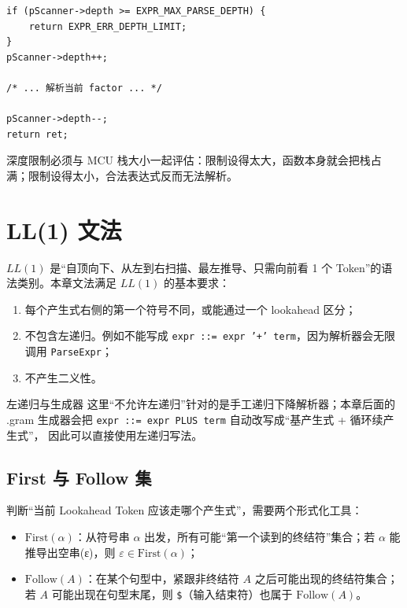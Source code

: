 \begin{lstlisting}[style=c]
if (pScanner->depth >= EXPR_MAX_PARSE_DEPTH) {
    return EXPR_ERR_DEPTH_LIMIT;
}
pScanner->depth++;

/* ... 解析当前 factor ... */

pScanner->depth--;
return ret;
\end{lstlisting}

深度限制必须与 MCU 栈大小一起评估：限制设得太大，函数本身就会把栈占满；限制设得太小，合法表达式反而无法解析。

\section{LL(1) 文法}

$LL(1)$ 是“自顶向下、从左到右扫描、最左推导、只需向前看 1 个 Token”的语法类别。本章文法满足 $LL(1)$ 的基本要求：

\begin{enumerate}
\item 每个产生式右侧的第一个符号不同，或能通过一个 lookahead 区分；
\item 不包含左递归。例如不能写成 \texttt{expr ::= expr '+' term}，因为解析器会无限调用 \texttt{ParseExpr}；
\item 不产生二义性。
\end{enumerate}

\begin{anybox}{左递归与生成器}
这里“不允许左递归”针对的是手工递归下降解析器；本章后面的 .gram 生成器会把
\texttt{expr ::= expr PLUS term} 自动改写成“基产生式 + 循环续产生式”，
因此可以直接使用左递归写法。
\end{anybox}

\subsection{First 与 Follow 集}

判断“当前 Lookahead Token 应该走哪个产生式”，需要两个形式化工具：

\begin{itemize}
\item $\mathrm{First}(\alpha)$：从符号串 $\alpha$ 出发，所有可能“第一个读到的终结符”集合；若 $\alpha$ 能推导出空串(ε)，则 $\varepsilon \in \mathrm{First}(\alpha)$；
\item $\mathrm{Follow}(A)$：在某个句型中，紧跟非终结符 $A$ 之后可能出现的终结符集合；若 $A$ 可能出现在句型末尾，则 \texttt{\$}（输入结束符）也属于 $\mathrm{Follow}(A)$。
\end{itemize}

